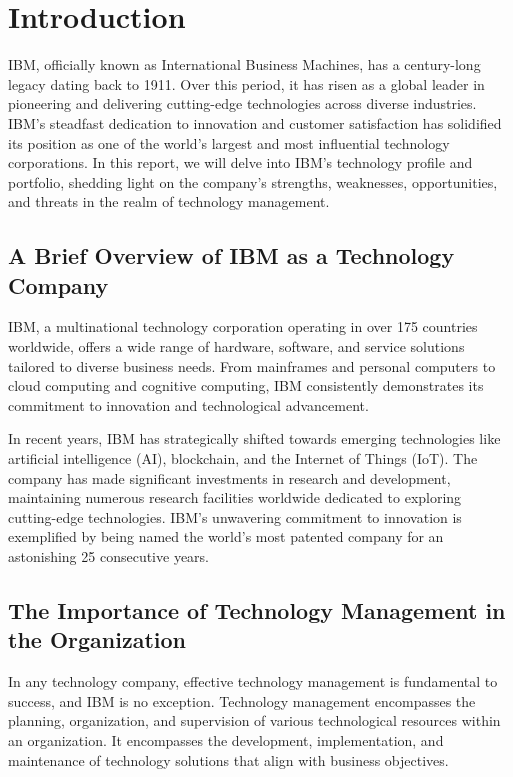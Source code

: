 \newpage
\section{Introduction}
IBM, officially known as International Business Machines, has a century-long legacy dating back to 1911. Over this period, it has risen as a global leader in pioneering and delivering cutting-edge technologies across diverse industries. IBM's steadfast dedication to innovation and customer satisfaction has solidified its position as one of the world's largest and most influential technology corporations. In this report, we will delve into IBM's technology profile and portfolio, shedding light on the company's strengths, weaknesses, opportunities, and threats in the realm of technology management.


\subsection{A Brief Overview of IBM as a Technology Company}
IBM, a multinational technology corporation operating in over 175 countries worldwide, offers a wide range of hardware, software, and service solutions tailored to diverse business needs. From mainframes and personal computers to cloud computing and cognitive computing, IBM consistently demonstrates its commitment to innovation and technological advancement.

In recent years, IBM has strategically shifted towards emerging technologies like artificial intelligence (AI), blockchain, and the Internet of Things (IoT). The company has made significant investments in research and development, maintaining numerous research facilities worldwide dedicated to exploring cutting-edge technologies. IBM's unwavering commitment to innovation is exemplified by being named the world's most patented company for an astonishing 25 consecutive years.

\subsection{The Importance of Technology Management in the Organization}
In any technology company, effective technology management is fundamental to success, and IBM is no exception. Technology management encompasses the planning, organization, and supervision of various technological resources within an organization. It encompasses the development, implementation, and maintenance of technology solutions that align with business objectives.

